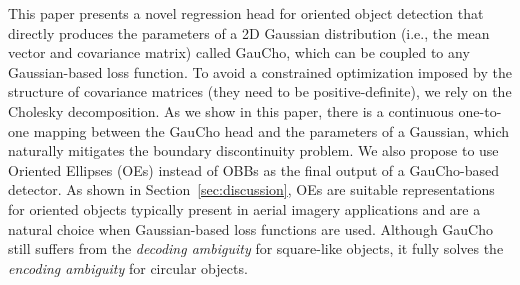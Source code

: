 This paper presents a novel regression head for oriented object detection that directly produces the parameters of a 2D Gaussian distribution (i.e., the mean vector and covariance matrix) called GauCho, which can be coupled to any Gaussian-based loss function. To avoid a constrained optimization imposed by the structure of covariance matrices (they need to be positive-definite), we rely on the Cholesky decomposition. As we show in this paper, there is a continuous one-to-one mapping between the GauCho head and the parameters of a Gaussian, which naturally mitigates the boundary discontinuity problem. We also propose to use Oriented Ellipses (OEs) instead of OBBs as the final output of a GauCho-based detector. As shown in Section~\ref{sec:discussion}, OEs are suitable representations for oriented objects typically present in aerial imagery applications and are a natural choice when Gaussian-based loss functions are used. Although GauCho still suffers from the \textit{decoding ambiguity} for square-like objects, it fully solves the \textit{encoding ambiguity} for circular objects.